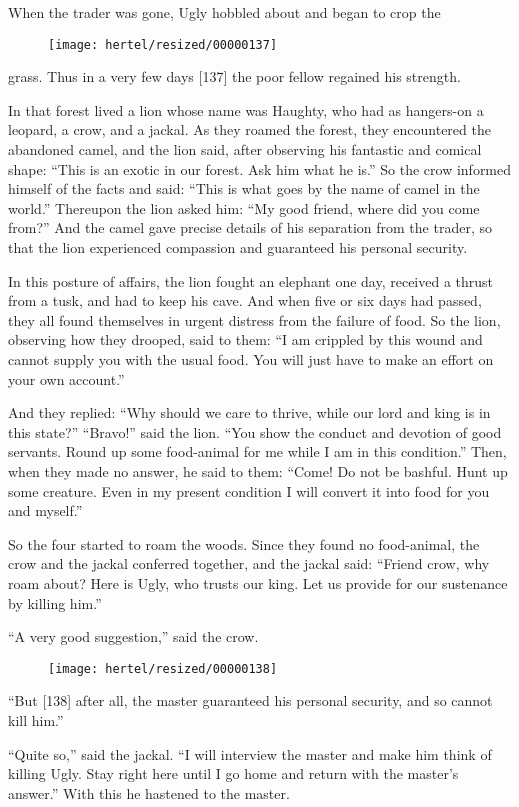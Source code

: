\documentclass[article, twoside, 10pt]{memoir}
\begin{document}
When the trader was gone, Ugly hobbled about and began to crop the
\begin{figure}[p]\texttt{[image: hertel/resized/00000137]}\end{figure}grass. Thus in a very few days [137] the poor fellow regained his
strength.

In that forest lived a lion whose name was Haughty, who had as
hangers-on a leopard, a crow, and a jackal. As they roamed the
forest, they encountered the abandoned camel, and the lion said,
after observing his fantastic and comical shape:
``This is an exotic in our forest. Ask him what he is.'' So the
crow informed himself of the facts and said:
``This is what goes by the name of camel in the world.'' Thereupon
the lion asked him: ``My good friend, where did you come from?''
And the camel gave precise details of his separation from the
trader, so that the lion experienced compassion and guaranteed his
personal security.

In this posture of affairs, the lion fought an elephant one day,
received a thrust from a tusk, and had to keep his cave. And when
five or six days had passed, they all found themselves in urgent
distress from the failure of food. So the lion, observing how they
drooped, said to them:
``I am crippled by this wound and cannot supply you with the usual food. You will just have to make an effort on your own account.''

And they replied:
``Why should we care to thrive, while our lord and king is in this state?''
``Bravo!'' said the lion.
``You show the conduct and devotion of good servants. Round up some food-animal for me while I am in this condition.''
Then, when they made no answer, he said to them:
``Come! Do not be bashful. Hunt up some creature. Even in my present condition I will convert it into food for you and myself.''

So the four started to roam the woods. Since they found no
food-animal, the crow and the jackal conferred together, and the
jackal said:
``Friend crow, why roam about? Here is Ugly, who trusts our king. Let us provide for our sustenance by killing him.''

``A very good suggestion,'' said the crow.
\begin{figure}[p]\texttt{[image: hertel/resized/00000138]}\end{figure}``But [138] after all, the master guaranteed his personal security, and so cannot kill him.''

``Quite so,'' said the jackal.
``I will interview the master and make him think of killing Ugly. Stay right here until I go home and return with the master's answer.''
With this he hastened to the master.
\end{document}
